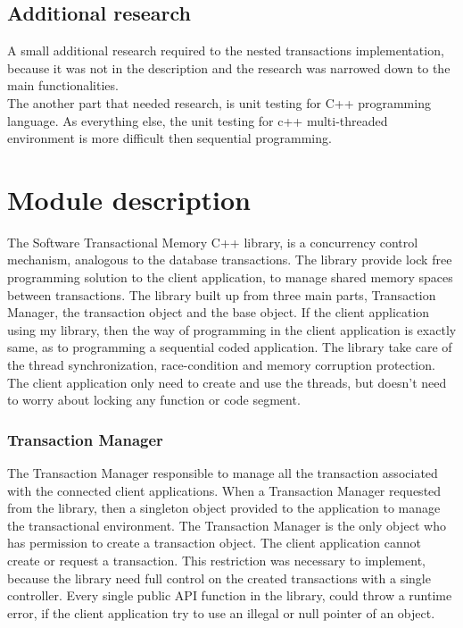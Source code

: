 \documentclass[12pt]{article}
\begin{document}
\subsection{Additional research}
A small additional research required to the nested transactions implementation, because it was not in the description and the research was narrowed down to the main functionalities.\\
The another part that needed research, is unit testing for C++ programming language.\cite{cookbook} As everything else, the unit testing for c++ multi-threaded environment is more difficult then sequential programming.

\section{Module description}
The Software Transactional Memory C++ library, is a concurrency control mechanism, analogous to the database transactions. The library provide lock free programming solution to the client application, to manage shared memory spaces between transactions. The library built up from three main parts, Transaction Manager, the transaction object and the base object. If the client application using my library, then the way of programming in the client application is exactly same, as to programming a sequential coded application. The library take care of the thread synchronization, race-condition and memory corruption protection. The client application only need to create and use the threads, but doesn't need to worry about locking any function or code segment.   


\subsubsection{Transaction Manager}
The Transaction Manager responsible to manage all the transaction associated with the connected client applications. When a Transaction Manager requested from the library, then a singleton object provided to the application to manage the transactional environment. The Transaction Manager is the only object who has permission to create a transaction object. The client application cannot create or request a transaction. This restriction was necessary to implement, because the library need full control on the created transactions with a single controller. Every single public API function in the library, could throw a runtime error, if the client application try to use an illegal or null pointer of an object.\\
\end{document}
